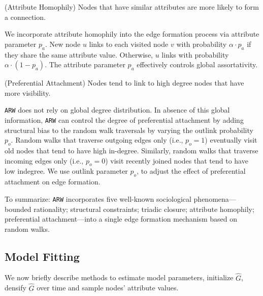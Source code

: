 \begin{ph}
	(Attribute Homophily) Nodes that have similar attributes are more likely
	to form a connection. \cite{mcpherson2001birds}
\end{ph}
We incorporate attribute homophily into the edge formation process via attribute parameter $p_a$. New node
$u$ links to each visited node $v$ with probability $\alpha \cdot p_a$ if they share
the same attribute value. Otherwise, $u$ links with probability $\alpha \cdot (1-p_a)$.
The attribute parameter $p_a$ effectively controls global assortativity.

\begin{ph}
	(Preferential Attachment) Nodes tend to link to high degree nodes that have more
	visibility. \cite{barabasi1999emergence}
\end{ph}
\texttt{ARW} does not rely on global degree distribution. In absence of this global information, \texttt{ARW} can control the degree of preferential attachment by adding structural bias to the random walk traversals by varying the outlink probability $p_o$. Random walks that traverse outgoing edges only (i.e., $p_o =1$) eventually visit old nodes that tend to have high in-degree. Similarly, random walks that traverse incoming edges only (i.e., $p_o=0$) visit recently joined nodes that tend to have low indegree. We use outlink parameter $p_o$, to adjust the effect of preferential attachment on edge formation.

To summarize: \texttt{ARW} incorporates five well-known sociological phenomena---
bounded rationality; structural constraints; triadic closure; attribute homophily; preferential attachment---into a single edge
formation mechanism based on random walks.




\subsection{Model Fitting}
\label{sub:Model Fitting}

We now briefly describe methods to estimate model parameters,
initialize $\hat{G}$, densify $\hat{G}$ over time and sample nodes' attribute values.

